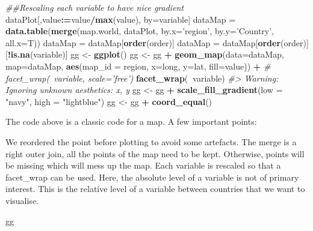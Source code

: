 \documentclass[]{book}
\newenvironment{Shaded}{\begin{snugshade}}{\end{snugshade}}
\newcommand{\CommentTok}[1]{\textcolor[rgb]{0.56,0.35,0.01}{\textit{#1}}}
\newcommand{\DataTypeTok}[1]{\textcolor[rgb]{0.13,0.29,0.53}{#1}}
\newcommand{\ErrorTok}[1]{\textcolor[rgb]{0.64,0.00,0.00}{\textbf{#1}}}
\newcommand{\KeywordTok}[1]{\textcolor[rgb]{0.13,0.29,0.53}{\textbf{#1}}}
\newcommand{\NormalTok}[1]{#1}
\newcommand{\OperatorTok}[1]{\textcolor[rgb]{0.81,0.36,0.00}{\textbf{#1}}}
\newcommand{\StringTok}[1]{\textcolor[rgb]{0.31,0.60,0.02}{#1}}
\begin{document}
\begin{Shaded}
\begin{Highlighting}[]
\CommentTok{##Rescaling each variable to have nice gradient}
\NormalTok{dataPlot[,value}\OperatorTok{:}\ErrorTok{=}\NormalTok{value}\OperatorTok{/}\KeywordTok{max}\NormalTok{(value), by=variable]}
\NormalTok{dataMap =}\StringTok{ }\KeywordTok{data.table}\NormalTok{(}\KeywordTok{merge}\NormalTok{(map.world, dataPlot, }
                           \DataTypeTok{by.x=}\StringTok{'region'}\NormalTok{, }
                           \DataTypeTok{by.y=}\StringTok{'Country'}\NormalTok{, }
                           \DataTypeTok{all.x=}\NormalTok{T))}
\NormalTok{dataMap =}\StringTok{ }\NormalTok{dataMap[}\KeywordTok{order}\NormalTok{(order)]}
\NormalTok{dataMap =}\StringTok{ }\NormalTok{dataMap[}\KeywordTok{order}\NormalTok{(order)][}\OperatorTok{!}\KeywordTok{is.na}\NormalTok{(variable)]}
\NormalTok{gg <-}\StringTok{ }\KeywordTok{ggplot}\NormalTok{()}
\NormalTok{gg <-}\StringTok{ }\NormalTok{gg }\OperatorTok{+}\StringTok{ }
\StringTok{    }\KeywordTok{geom_map}\NormalTok{(}\DataTypeTok{data=}\NormalTok{dataMap, }\DataTypeTok{map=}\NormalTok{dataMap, }
             \KeywordTok{aes}\NormalTok{(}\DataTypeTok{map_id =}\NormalTok{ region, }\DataTypeTok{x=}\NormalTok{long, }\DataTypeTok{y=}\NormalTok{lat, }\DataTypeTok{fill=}\NormalTok{value)) }\OperatorTok{+}
\StringTok{    }\CommentTok{# facet_wrap(~variable, scale='free')}
\StringTok{    }\KeywordTok{facet_wrap}\NormalTok{(}\OperatorTok{~}\NormalTok{variable)}
\CommentTok{#> Warning: Ignoring unknown aesthetics: x, y}
\NormalTok{gg <-}\StringTok{ }\NormalTok{gg }\OperatorTok{+}\StringTok{ }\KeywordTok{scale_fill_gradient}\NormalTok{(}\DataTypeTok{low =} \StringTok{"navy"}\NormalTok{, }\DataTypeTok{high =} \StringTok{"lightblue"}\NormalTok{)}
\NormalTok{gg <-}\StringTok{ }\NormalTok{gg }\OperatorTok{+}\StringTok{ }\KeywordTok{coord_equal}\NormalTok{()}
\end{Highlighting}
\end{Shaded}

The code above is a classic code for a map. A few important points:

We reordered the point before plotting to avoid some artefacts.
The merge is a right outer join, all the points of the map need to be kept. Otherwise, points will be missing which will mess up the map.
Each variable is rescaled so that a facet\_wrap can be used. Here, the absolute level of a variable is not of primary interest. This is the relative level of a variable between countries that we want to visualise.

\begin{Shaded}
\begin{Highlighting}[]
\NormalTok{gg}
\end{Highlighting}
\end{Shaded}
\end{document}

